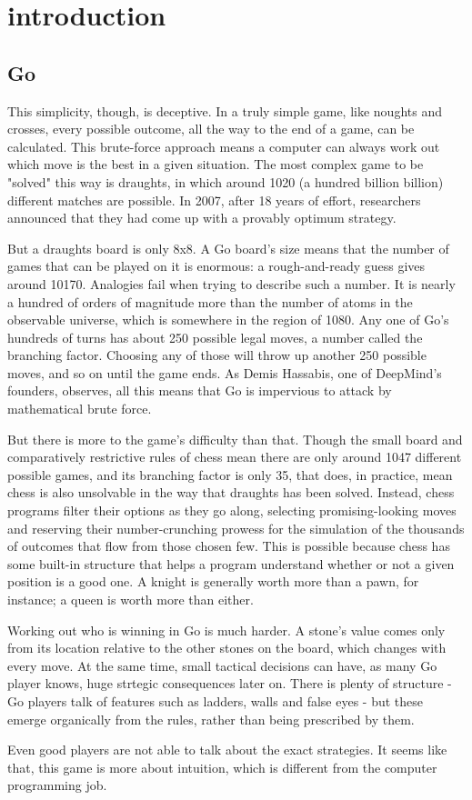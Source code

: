 \section{introduction}
\subsection{Go}
This simplicity, though, is deceptive. In a truly simple game, like noughts and crosses, every possible outcome, all the way to the end of a game, can be calculated. This brute-force approach means a computer can always work out which move is the best in a given situation. The most complex game to be "solved" this way is draughts, in which around 1020 (a hundred billion billion) different matches are possible. In 2007, after 18 years of effort, researchers announced that they had come up with a provably optimum strategy.

But a draughts board is only 8x8. A Go board’s size means that the number of games that can be played on it is enormous: a rough-and-ready guess gives around 10170. Analogies fail when trying to describe such a number. It is nearly a hundred of orders of magnitude more than the number of atoms in the observable universe, which is somewhere in the region of 1080. Any one of Go’s hundreds of turns has about 250 possible legal moves, a number called the branching factor. Choosing any of those will throw up another 250 possible moves, and so on until the game ends. As Demis Hassabis, one of DeepMind’s founders, observes, all this means that Go is impervious to attack by mathematical brute force.

But there is more to the game’s difficulty than that. Though the small board and comparatively restrictive rules of chess mean there are only around 1047 different possible games, and its branching factor is only 35, that does, in practice, mean chess is also unsolvable in the way that draughts has been solved. Instead, chess programs filter their options as they go along, selecting promising-looking moves and reserving their number-crunching prowess for the simulation of the thousands of outcomes that flow from those chosen few. This is possible because chess has some built-in structure that helps a program understand whether or not a given position is a good one. A knight is generally worth more than a pawn, for instance; a queen is worth more than either.

Working out who is winning in Go is much harder. A stone's value comes only from its location relative to the other stones on the board, which changes with every move. At the same time, small tactical decisions can have, as many Go player knows, huge strtegic consequences later on. There is plenty of structure - Go players talk of features such as ladders, walls and false eyes - but these emerge organically from the rules, rather than being prescribed by them.

Even good players are not able to talk about the exact strategies. It seems like that, this game is more about intuition, which is different from the computer programming job.